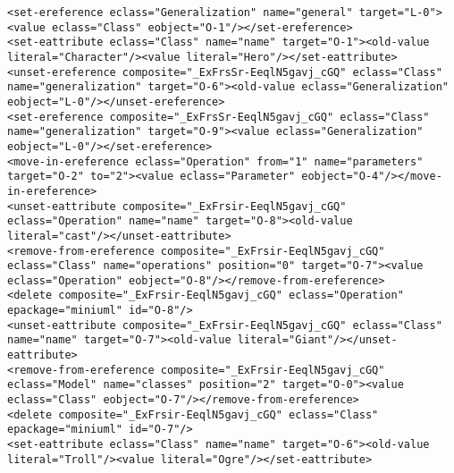 \begin{lstlisting}[style=cbpfile,caption={Change-based representation of the model in Figure \ref{fig:class_diagram_left}.},label=lst:class_diagram_left_cbpfile]
<set-ereference eclass="Generalization" name="general" target="L-0"><value eclass="Class" eobject="O-1"/></set-ereference>
<set-eattribute eclass="Class" name="name" target="O-1"><old-value literal="Character"/><value literal="Hero"/></set-eattribute>
<unset-ereference composite="_ExFrsSr-EeqlN5gavj_cGQ" eclass="Class" name="generalization" target="O-6"><old-value eclass="Generalization" eobject="L-0"/></unset-ereference>
<set-ereference composite="_ExFrsSr-EeqlN5gavj_cGQ" eclass="Class" name="generalization" target="O-9"><value eclass="Generalization" eobject="L-0"/></set-ereference>
<move-in-ereference eclass="Operation" from="1" name="parameters" target="O-2" to="2"><value eclass="Parameter" eobject="O-4"/></move-in-ereference>
<unset-eattribute composite="_ExFrsir-EeqlN5gavj_cGQ" eclass="Operation" name="name" target="O-8"><old-value literal="cast"/></unset-eattribute>
<remove-from-ereference composite="_ExFrsir-EeqlN5gavj_cGQ" eclass="Class" name="operations" position="0" target="O-7"><value eclass="Operation" eobject="O-8"/></remove-from-ereference>
<delete composite="_ExFrsir-EeqlN5gavj_cGQ" eclass="Operation" epackage="miniuml" id="O-8"/>
<unset-eattribute composite="_ExFrsir-EeqlN5gavj_cGQ" eclass="Class" name="name" target="O-7"><old-value literal="Giant"/></unset-eattribute>
<remove-from-ereference composite="_ExFrsir-EeqlN5gavj_cGQ" eclass="Model" name="classes" position="2" target="O-0"><value eclass="Class" eobject="O-7"/></remove-from-ereference>
<delete composite="_ExFrsir-EeqlN5gavj_cGQ" eclass="Class" epackage="miniuml" id="O-7"/>
<set-eattribute eclass="Class" name="name" target="O-6"><old-value literal="Troll"/><value literal="Ogre"/></set-eattribute>
\end{lstlisting}
